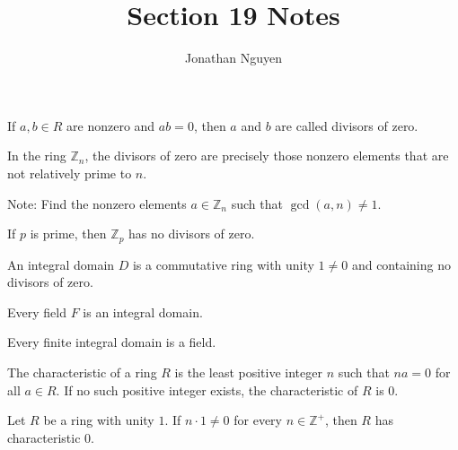 \documentclass[11pt]{article}
\title{Section 19 Notes}
\author{Jonathan Nguyen}
\date{}
\begin{document}
\maketitle

\begin{definition}
If $a,b \in R$ are nonzero and $ab=0$, then
$a$ and $b$ are called divisors of zero.
\end{definition}

\begin{theorem}
In the ring $\mathbb{Z}_n$, the divisors of zero are
precisely those nonzero elements that are not
relatively prime to $n$.
\end{theorem}

\noindent
Note: Find the nonzero elements $a \in \mathbb{Z}_n$
such that $\gcd(a,n) \neq 1$.

\begin{corollary}
If $p$ is prime, then $\mathbb{Z}_p$ has no
divisors of zero.
\end{corollary}

\begin{definition}
An integral domain $D$ is a commutative ring
with unity $1 \neq 0$ and containing no
divisors of zero.
\end{definition}

\begin{theorem}
Every field $F$ is an integral domain.
\end{theorem}

\begin{theorem}
Every finite integral domain is a field.
\end{theorem}

\begin{definition}
The characteristic of a ring $R$ is the least
positive integer $n$ such that $na=0$ for all
$a \in R$. If no such positive integer exists,
the characteristic of $R$ is $0$.
\end{definition}

\begin{theorem}
Let $R$ be a ring with unity $1$.
If $n \cdot 1 \neq 0$ for every
$n \in \mathbb{Z}^{+}$, then $R$ has
characteristic $0$.
\end{theorem}
\end{document}
